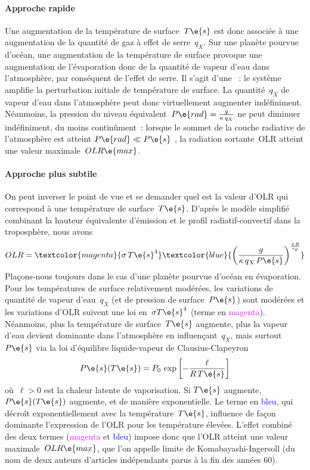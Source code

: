 

\sk
\paragraph{Approche rapide} Une augmentation de la température de surface~$T\e{s}$ 
est donc associée à une augmentation de la quantité de gaz à effet de serre~$q_X$.
Sur une planète pourvue d'océan,
une augmentation de la température de surface
provoque une augmentation de l'évaporation
donc de la quantité de vapeur d'eau dans l'atmosphère, 
par conséquent de l'effet de serre.
Il s'agit d'une ~:
le système amplifie la perturbation initiale de température de surface.
La quantité~$q_X$ de vapeur d'eau dans l'atmosphère
peut donc virtuellement augmenter indéfiniment.
Néanmoins, la pression du niveau équivalent~$P\e{rad} = \frac{g}{\kappa \, q_X}$
ne peut diminuer indéfiniment, du moins continûment~:
lorsque le sommet de la couche radiative de l'atmosphère
est atteint $P\e{rad} \ll P\e{s}$ , la radiation sortante~OLR
atteint une valeur maximale~$OLR\e{max}$.

\sk
\paragraph{Approche plus subtile} On peut inverser le point de vue et se demander quel est la valeur
d'OLR qui correspond à une température de surface~$T\e{s}$.
D'après le modèle simplifié combinant la hauteur équivalente
d'émission et le profil radiatif-convectif dans la troposphère, nous avons
\[ OLR  = \textcolor{magenta}{\sigma \, T\e{s}^4} \textcolor{blue}{\left( \frac{g}{\kappa \, q_X \, P\e{s}} \right)^{\frac{4 \, R}{c_p}}} \]
Plaçons-nous toujours dans le cas d'une planète pourvue
d'océan en évaporation.
Pour les températures de surface relativement modérées,
les variations de quantité de vapeur d'eau~$q_X$
(et de pression de surface~$P\e{s}$)
sont modérées et les variations d'OLR suivent 
une loi en~$\sigma T\e{s}^4$ (terme en \textcolor{magenta}{magenta}).
Néanmoins, plus la température de surface~$T\e{s}$
augmente, plus la vapeur d'eau devient dominante
dans l'atmosphère en influençant~$q_X$, mais
surtout~$P\e{s}$ via la loi d'équilibre liquide-vapeur
de Clausius-Clapeyron
\[  P\e{s}(T\e{s}) = P_0 \, \exp{ \left[ -\frac{\ell}{R\,T\e{s}} \right] }   \]
\noindent où~$\ell > 0$ est la chaleur latente de vaporisation.
Si $T\e{s}$ augmente, $P\e{s}(T\e{s})$ augmente, et de manière exponentielle.
Le terme en \textcolor{blue}{bleu}, qui décroît exponentiellement avec
la température~$T\e{s}$, influence de façon dominante
l'expression de l'OLR pour les température élevées.
L'effet combiné des deux termes 
(\textcolor{magenta}{magenta} et \textcolor{blue}{bleu})
impose donc que l'OLR atteint une valeur maximale~$OLR\e{max}$,
que l'on appelle limite de Komabayashi-Ingersoll
(du nom de deux auteurs d'articles indépendants parus à la fin des années 60).

